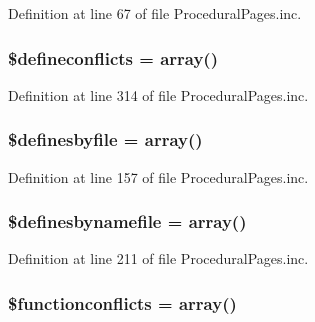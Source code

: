 \-Definition at line 67 of file \-Procedural\-Pages.\-inc.

\hypertarget{class_procedural_pages_a6f24d4cebb4c89eda4d01a52b8382b28}{
\subsubsection[{\$defineconflicts}]{\setlength{\rightskip}{0pt plus 5cm}\$defineconflicts = array()}}\label{class_procedural_pages_a6f24d4cebb4c89eda4d01a52b8382b28}


\-Definition at line 314 of file \-Procedural\-Pages.\-inc.

\hypertarget{class_procedural_pages_a5fd9624434a969d6c18cb57216131a9d}{
\subsubsection[{\$definesbyfile}]{\setlength{\rightskip}{0pt plus 5cm}\$definesbyfile = array()}}\label{class_procedural_pages_a5fd9624434a969d6c18cb57216131a9d}


\-Definition at line 157 of file \-Procedural\-Pages.\-inc.

\hypertarget{class_procedural_pages_adcb4f118bec255d316667f064d6fa24c}{
\subsubsection[{\$definesbynamefile}]{\setlength{\rightskip}{0pt plus 5cm}\$definesbynamefile = array()}}\label{class_procedural_pages_adcb4f118bec255d316667f064d6fa24c}


\-Definition at line 211 of file \-Procedural\-Pages.\-inc.

\hypertarget{class_procedural_pages_a8bb2f1cb74fe52fa701033398f005d26}{
\subsubsection[{\$functionconflicts}]{\setlength{\rightskip}{0pt plus 5cm}\$functionconflicts = array()}}\label{class_procedural_pages_a8bb2f1cb74fe52fa701033398f005d26}



